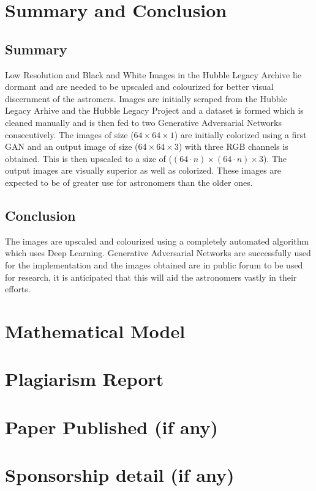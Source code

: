 \documentclass[oneside,a4paper,12pt]{report}
\begin{document}
 \chapter{Summary and Conclusion}
 \section{Summary}
 Low Resolution and Black and White Images in the Hubble Legacy Archive lie dormant and are needed to be upscaled and colourized for better visual discernment of the astromers. Images are initially scraped from the Hubble Legacy Arhive and the Hubble Legacy Project and a dataset is formed which is cleaned manually and is then fed to two Generative Adversarial Networks consecutively. The images of size ($64\times 64\times 1$) are initially colorized using a first GAN and an output image of size ($64\times 64\times 3$) with three RGB channels is obtained. This is then upscaled to a size of ($(64\cdot n)\times (64\cdot n)\times 3$). The output images are visually superior as well as colorized. These images are expected to be of greater use for astronomers than the older ones.

\section{Conclusion}
The images are upscaled and colourized using a completely automated algorithm which uses Deep Learning. Generative Adversarial Networks are  successfully used for the implementation and the images obtained are in public forum to be used for research, it is anticipated that this will aid the astronomers vastly in their efforts.





\begin{appendices}


\chapter{Mathematical Model}











\chapter{Plagiarism Report }


\chapter{Paper Published (if any)}

\chapter{Sponsorship detail (if any)}



\end{appendices}
\end{document}
